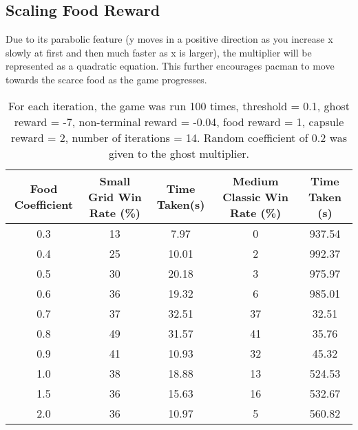 \documentclass[12pt]{report}
\begin{document}
            \subsection*{Scaling Food Reward}
            Due to its parabolic feature (y moves in a positive direction as you increase x slowly at first and then much faster as x is larger), the multiplier will be represented as a quadratic equation. This further encourages pacman to move towards the scarce food as the game progresses.
              \begin{table}[H]
                \begin{center}
                  \begin{adjustbox}{max width=\textwidth}
                    \begin{tabular}{*{5}{c}}
                      \textbf{Food Coefficient} & \textbf{Small Grid Win Rate (\%)} & \textbf{Time Taken(s)} & \textbf{Medium Classic Win Rate (\%)} & \textbf{Time Taken (s)}\\
                    \hline
                          0.3 & 13 & 7.97 & 0 & 937.54 \\
                          0.4 & 25 & 10.01 & 2 & 992.37 \\
                          0.5 & 30 & 20.18 & 3 & 975.97 \\
                          0.6 & 36 & 19.32 & 6 & 985.01 \\
                          0.7 & 37 & 32.51 & 37 & 32.51 \\
                          0.8 & 49 & 31.57 & 41 & 35.76 \\
                          0.9 & 41 & 10.93 & 32 & 45.32 \\
                          1.0 & 38 & 18.88 & 13 & 524.53 \\
                          1.5 & 36 & 15.63 & 16 & 532.67 \\
                          2.0 & 36 & 10.97 & 5 & 560.82 \\

                  \end{tabular}
                  \end{adjustbox}
                  \caption{For each iteration, the game was run 100 times, threshold = 0.1, ghost reward = -7, non-terminal reward = -0.04, food reward = 1, capsule reward = 2, number of iterations = 14. Random coefficient of 0.2 was given to the ghost multiplier.}
                  \label{tab:table4}
                \end{center}
              \end{table}
\end{document}

